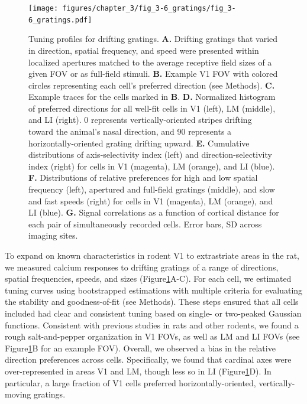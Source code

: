 \begin{figure}[t!]
    \texttt{[image: figures/chapter\_3/fig\_3-6\_gratings/fig\_3-6\_gratings.pdf]}
    \vspace{.1in}
    \caption[Responses to drifting gratings]{Tuning profiles for drifting gratings.
    \textbf{A.} Drifting gratings that varied in direction, spatial frequency, and speed were presented within localized apertures matched to the average receptive field sizes of a given FOV or as full-field stimuli.
    \textbf{B.} Example V1 FOV with colored circles representing each cell's preferred direction (see Methods).
    \textbf{C.} Example traces for the cells marked in \textbf{B}. 
    \textbf{D.} Normalized histogram of preferred directions for all well-fit cells in V1 (left), LM (middle), and LI (right). 0 represents vertically-oriented stripes drifting toward the animal's nasal direction, and 90 represents a horizontally-oriented grating drifting upward.
    \textbf{E.} Cumulative distributions of axis-selectivity index (left) and direction-selectivity index (right) for cells in V1 (magenta), LM (orange), and LI (blue).
    \textbf{F.} Distributions of relative preferences for high and low spatial frequency (left), apertured and full-field gratings (middle), and slow and fast speeds (right) for cells in V1 (magenta), LM (orange), and LI (blue).
    \textbf{G.} Signal correlations as a function of cortical distance for each pair of simultaneously recorded cells. Error bars, SD across imaging sites.  
    \label{fig:gratings}}
\end{figure}

To expand on known characteristics in rodent V1 to extrastriate areas in the rat, we measured calcium responses to drifting gratings of a range of directions, spatial frequencies, speeds, and sizes (Figure\ref{fig:gratings}A-C). For each cell, we estimated tuning curves using bootstrapped estimations with multiple criteria for evaluating the stability and goodness-of-fit (see Methods)\cite{Liang2018}. These steps ensured that all cells included had clear and consistent tuning based on single- or two-peaked Gaussian functions. Consistent with previous studies in rats and other rodents, we found a rough salt-and-pepper organization in V1 FOVs, as well as LM and LI FOVs (see Figure\ref{fig:gratings}B for an example FOV). Overall, we observed a bias in the relative direction preferences across cells. Specifically, we found that cardinal axes were over-represented in areas V1 and LM, though less so in LI (Figure\ref{fig:gratings}D). In particular, a large fraction of V1 cells preferred horizontally-oriented, vertically-moving gratings.  

